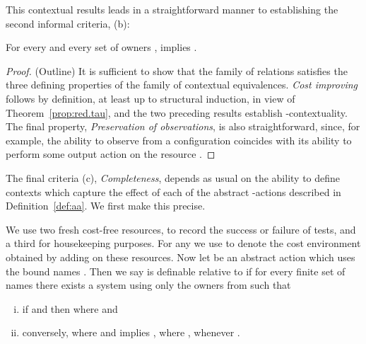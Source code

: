 \documentclass{LMCS}
\begin{document}
This contextual results leads in a straightforward manner to establishing the second informal criteria, (b):
\begin{thm}[Soundness]
   For every  and every set of owners ,  
  implies  .
\end{thm}
\begin{proof}(Outline)
  It is sufficient to show that the family of relations  satisfies the 
 three defining properties of the family of contextual equivalences. \emph{Cost improving} follows by
 definition, at least up to structural induction, in view of Theorem~\ref{prop:red.tau}, and  the two preceding
results establish -contextuality. The final property, \emph{Preservation of observations}, is also
straightforward, since, for example, the ability to observe  from a configuration coincides with its ability 
to perform some output action on the resource .  
\end{proof}

The final criteria (c), \emph{Completeness}, depends as usual on the ability to define contexts which
capture the effect of  each of the abstract -actions described in Definition~\ref{def:aa}. 
We first make this precise. 

\newcommand{\Csucc}{\cfn{succ}}
\newcommand{\Cfail}{\cfn{fail}}

We use two fresh cost-free resources,   to record the success or failure of
tests, and a third  for housekeeping purposes.
For any  we use   to denote  the cost environment  obtained by adding on these resources. 
Now let  be an abstract action which uses the bound names . Then we say  is definable
relative to 
if for every finite set of names  there exists a system   using only the owners from  such that
\begin{enumerate}[(i)]


\item if  and  then  where  and
  \medskip

\item conversely,  where  and  implies ,
  where , whenever .
\end{enumerate}
\end{document}
